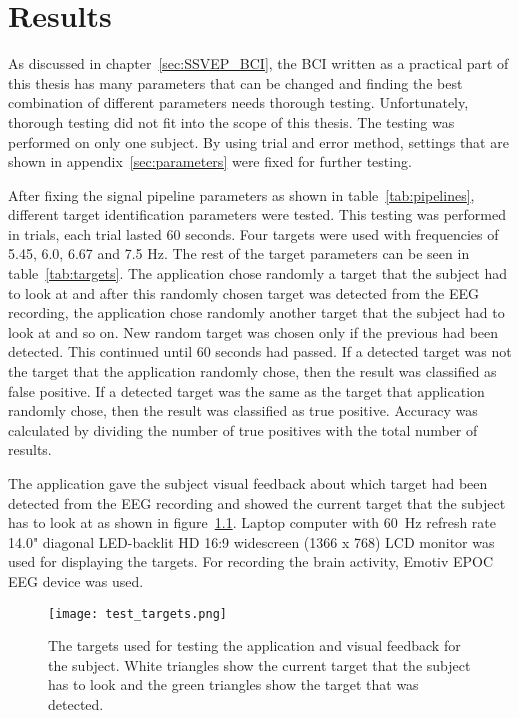 
\chapter{Results}

As discussed in chapter~\ref{sec:SSVEP_BCI}, the \gls{BCI} written as a practical part of this thesis has many parameters that can be changed and finding the best combination of different parameters needs thorough testing. Unfortunately, thorough testing did not fit into the scope of this thesis. The testing was performed on only one subject. By using trial and error method, settings that are shown in appendix~\ref{sec:parameters} were fixed for further testing.

After fixing the signal pipeline parameters as shown in table~\ref{tab:pipelines}, different target identification parameters were tested. This testing was performed in trials, each trial lasted 60 seconds. Four targets were used with frequencies of 5.45, 6.0, 6.67 and 7.5 Hz. The rest of the target parameters can be seen in table~\ref{tab:targets}. The application chose randomly a target that the subject had to look at and after this randomly chosen target was detected from the \gls{EEG} recording, the application chose randomly another \gls{target} that the subject had to look at and so on. New random \gls{target} was chosen only if the previous had been detected. This continued until 60 seconds had passed. If a detected \gls{target} was not the \gls{target} that the application randomly chose, then the result was classified as false positive. If a detected \gls{target} was the same as the \gls{target} that application randomly chose, then the result was classified as true positive. Accuracy was calculated by dividing the number of true positives with the total number of results.

The application gave the subject visual feedback about which \gls{target} had been detected from the \gls{EEG} recording and showed the current \gls{target} that the subject has to look at as shown in figure~\ref{fig:test_targets}. Laptop computer with \SI{60}{Hz} \gls{refresh rate} 14.0" diagonal LED-backlit HD 16:9 widescreen (1366 x 768) LCD monitor was used for displaying the \glspl{target}. For recording the brain activity, Emotiv EPOC \gls{EEG} device was used.

\begin{figure}[h]
	\centering
	\texttt{[image: test\_targets.png]}
	\caption{The targets used for testing the application and visual feedback for the subject. White triangles show the current target that the subject has to look and the green triangles show the target that was detected.}
	\label{fig:test_targets}
\end{figure}

